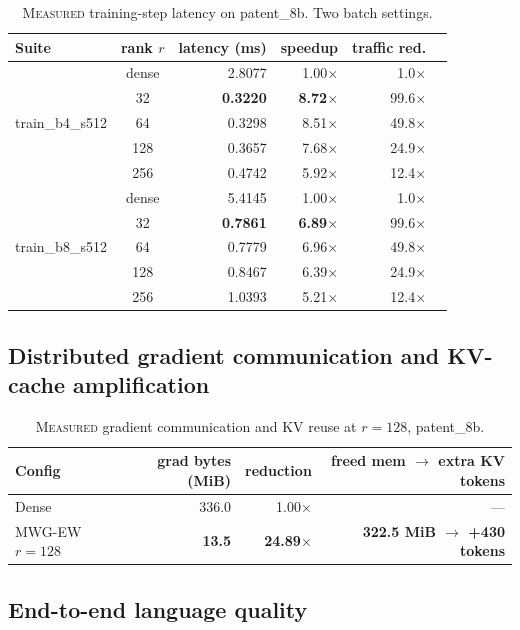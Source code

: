 \documentclass[11pt]{article}
\theoremstyle{definition}
\begin{document}
\begin{table}[h]
\centering
\caption{\textsc{Measured} training-step latency on patent\_8b. Two batch settings.}
\label{tab:train}
\small
\begin{tabular}{@{}lcrrrr@{}}
\toprule
Suite & rank $r$ & latency (ms) & speedup & traffic red. \\
\midrule
\multirow{5}{*}{train\_b4\_s512} & dense & 2.8077 & 1.00$\times$ & 1.0$\times$ \\
& 32  & \textbf{0.3220} & \textbf{8.72$\times$} & 99.6$\times$ \\
& 64  & 0.3298 & 8.51$\times$ & 49.8$\times$ \\
& 128 & 0.3657 & 7.68$\times$ & 24.9$\times$ \\
& 256 & 0.4742 & 5.92$\times$ & 12.4$\times$ \\
\midrule
\multirow{5}{*}{train\_b8\_s512} & dense & 5.4145 & 1.00$\times$ & 1.0$\times$ \\
& 32  & \textbf{0.7861} & \textbf{6.89$\times$} & 99.6$\times$ \\
& 64  & 0.7779 & 6.96$\times$ & 49.8$\times$ \\
& 128 & 0.8467 & 6.39$\times$ & 24.9$\times$ \\
& 256 & 1.0393 & 5.21$\times$ & 12.4$\times$ \\
\bottomrule
\end{tabular}
\end{table}

\subsection{Distributed gradient communication and KV-cache amplification}

\begin{table}[h]
\centering
\caption{\textsc{Measured} gradient communication and KV reuse at $r{=}128$, patent\_8b.}
\label{tab:grad}
\small
\begin{tabular}{@{}lrrr@{}}
\toprule
Config & grad bytes (MiB) & reduction & freed mem $\to$ extra KV tokens \\
\midrule
Dense & 336.0 & 1.00$\times$ & --- \\
\rowcolor{gray!10}
MWG-EW $r{=}128$ & \textbf{13.5} & \textbf{24.89$\times$} & \textbf{322.5 MiB $\to$ +430 tokens} \\
\bottomrule
\end{tabular}
\end{table}

\subsection{End-to-end language quality}
\end{document}
